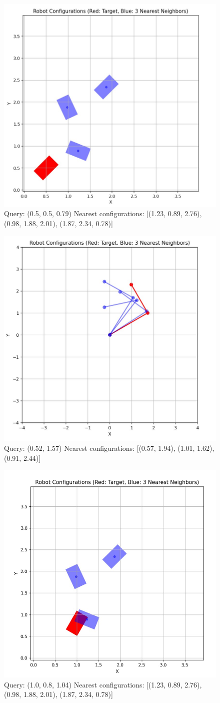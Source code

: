 \documentclass{article}
\begin{document}
\begin{figure} [H]
    \centering
    \includegraphics[width=0.5\linewidth]{latex_media/nearestFreeBody1.jpg}
    \caption{Query: (0.5, 0.5, 0.79)
    Nearest configurations: [(1.23, 0.89, 2.76), (0.98, 1.88, 2.01), (1.87, 2.34, 0.78)]
    }
\end{figure}

\begin{figure} [H]
    \centering
    \includegraphics[width=0.5\linewidth]{latex_media/nearestArm2.jpg}
    \caption{Query: (0.52, 1.57)
    Nearest configurations: [(0.57, 1.94), (1.01, 1.62), (0.91, 2.44)]}
\end{figure}

\begin{figure} [H]
    \centering
    \includegraphics[width=0.5\linewidth]{latex_media/nearestFreeBody2.jpg}
    \caption{Query: (1.0, 0.8, 1.04)
    Nearest configurations: [(1.23, 0.89, 2.76), (0.98, 1.88, 2.01), (1.87, 2.34, 0.78)]}
\end{figure}
\end{document}
